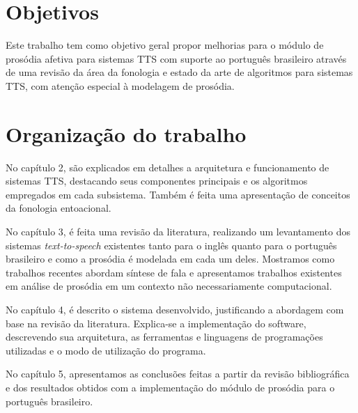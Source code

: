 \section{Objetivos}
Este trabalho tem como objetivo geral propor melhorias para o módulo de prosódia
afetiva para sistemas TTS com suporte ao português brasileiro através de uma
revisão da área da fonologia e estado da arte de algoritmos para sistemas TTS,
com atenção especial à modelagem de prosódia.

\section{Organização do trabalho}

No capítulo 2, são explicados em detalhes a arquitetura e funcionamento de sistemas
TTS, destacando seus componentes principais e os algoritmos empregados em cada
subsistema. Também é feita uma apresentação de conceitos da fonologia entoacional.


No capítulo 3, é feita uma revisão da literatura, realizando um levantamento dos
sistemas \emph{text-to-speech} existentes tanto para o inglês quanto para o
português brasileiro e como a prosódia é modelada em cada um deles. Mostramos
como trabalhos recentes abordam síntese de fala e apresentamos trabalhos
existentes em análise de prosódia em um contexto não necessariamente
computacional.

No capítulo 4, é descrito o sistema desenvolvido, justificando a abordagem com
base na revisão da literatura. Explica-se a implementação do software,
descrevendo sua arquitetura, as ferramentas e linguagens de programações
utilizadas e o modo de utilização do programa.

No capítulo 5, apresentamos as conclusões feitas a partir da revisão
bibliográfica e dos resultados obtidos com a implementação do módulo de prosódia
para o português brasileiro.